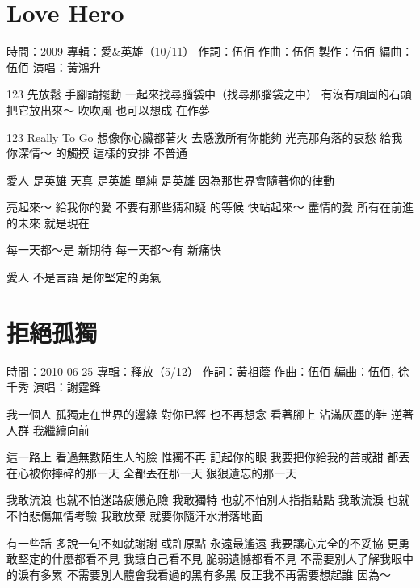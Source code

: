 \documentclass[UTF8,a4paper,oneside,twocolumn,12pt]{ctexbook}
\newcommand{\infopair}[2]{\textbullet #1：#2}
\newcommand{\zc}[1][伍佰]{\infopair{作詞}{#1}}
\newcommand{\zq}[1][伍佰]{\infopair{作曲}{#1}}
\newcommand{\bq}[1][伍佰]{\infopair{編曲}{#1}}
\newcommand{\zj}[1]{\infopair{專輯}{#1}}
\newcommand{\zz}[1]{\infopair{製作}{#1}}
\newcommand{\sj}[1]{\infopair{時間}{#1}}
\newenvironment{info}{\begin{flushleft}\kaishu
	}
	{\end{flushleft}\normalsize\yahei\par}
\newenvironment{lyric}{
	}
{}
\begin{document}
\section{Love Hero}
\begin{info}
	\sj{2009}
	\zj{愛\&英雄（10/11）}
	\zc
	\zq
	\zz{伍佰}
	\bq[伍佰]
	\infopair{演唱}{黃鴻升}
\end{info}
\begin{lyric}
	123 先放鬆 手腳請擺動
	一起來找尋腦袋中（找尋那腦袋之中） 有沒有頑固的石頭
	把它放出來～ 吹吹風
	也可以想成 在作夢

	123 Really To Go 想像你心臟都著火
	去感激所有你能夠 光亮那角落的哀愁
	給我你深情～ 的觸摸
	這樣的安排 不普通

	愛人 是英雄 天真 是英雄 單純 是英雄
	因為那世界會隨著你的律動

	亮起來～ 給我你的愛
	不要有那些猜和疑 的等候
	快站起來～ 盡情的愛
	所有在前進的未來 就是現在

	每一天都～是 新期待
	每一天都～有 新痛快

	愛人 不是言語 是你堅定的勇氣
\end{lyric}

\section{拒絕孤獨}
\begin{info}
	\sj{2010-06-25}
	\zj{釋放（5/12）}
	\zc[黃祖蔭]
	\zq
	\bq[伍佰, 徐千秀]
	\infopair{演唱}{謝霆鋒}
\end{info}
\begin{lyric}
	我一個人 孤獨走在世界的邊緣
	對你已經 也不再想念
	看著腳上 沾滿灰塵的鞋
	逆著人群 我繼續向前

	這一路上 看過無數陌生人的臉
	惟獨不再 記起你的眼
	我要把你給我的苦或甜
	都丟在心被你摔碎的那一天
	全都丟在那一天 狠狠遺忘的那一天

	我敢流浪 也就不怕迷路疲憊危險
	我敢獨特 也就不怕別人指指點點
	我敢流淚 也就不怕悲傷無情考驗
	我敢放棄 就要你隨汗水滑落地面

	有一些話 多說一句不如就謝謝
	或許原點 永遠最遙遠
	我要讓心完全的不妥協
	更勇敢堅定的什麼都看不見
	我讓自己看不見 脆弱遺憾都看不見
	不需要別人了解我眼中的淚有多累
	不需要別人體會我看過的黑有多黑
	反正我不再需要想起誰 因為～
\end{lyric}
\end{document}
